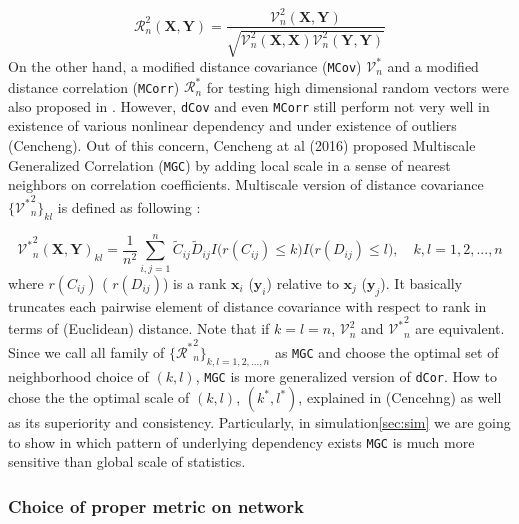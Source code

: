 \documentclass[12pt]{article}
\theoremstyle{definition}
\begin{document}
\begin{equation}	 
\mathcal{R}_{n}^{2} (\boldsymbol{X}, \boldsymbol{Y}) = \frac{\mathcal{V}^2_{n} (\boldsymbol{X}, \boldsymbol{Y}) }{\sqrt{\mathcal{V}^2_{n} (\boldsymbol{X}, \boldsymbol{X}) \mathcal{V}^2_{n} (\boldsymbol{Y}, \boldsymbol{Y}) } }
\end{equation}
On the other hand, a modified distance covariance (\texttt{MCov}) $\mathcal{V}^*_{n}$ and a modified distance correlation (\texttt{MCorr}) $\mathcal{R}^{*}_{n}$ for testing high dimensional random vectors were also proposed in \cite{szekely2013distance}.   
However, \texttt{dCov} and even \texttt{MCorr} still perform not very well in existence of various nonlinear dependency and under existence of outliers (Cencheng). Out of this concern, Cencheng at al (2016) proposed Multiscale Generalized Correlation (\texttt{MGC}) by adding local scale in a sense of nearest neighbors on correlation coefficients. Multiscale version of distance covariance $\{ { {\mathcal{V}^{*}}^2_{n} }   \}_{kl}$ is defined as following : 
	
\begin{equation}
\label{eq:MGC}
{\mathcal{V}^{*}}^2_{n} (\boldsymbol{X}, \boldsymbol{Y})_{kl} = \frac{1}{n^2} \sum\limits_{i,j=1}^{n} \tilde{C}_{ij} \tilde{D}_{ij} I \big( r(C_{ij}) \leq k \big) I \big( r(D_{ij}) \leq l  \big), \quad k,l=1,2,..., n 
\end{equation}
where $r(C_{ij})$ ( $r(D_{ij})$) is a rank $\mathbf{x}_{i}$ ($\mathbf{y}_{i}$) relative to $\mathbf{x}_{j}$ ($\mathbf{y}_{j}$). It basically truncates each pairwise element of distance covariance with respect to rank in terms of (Euclidean) distance. Note that if $k=l=n$, $\mathcal{V}^2_{n}$ and ${\mathcal{V}^{*}}^2_{n}$ are equivalent. Since we call all family of $\{  {\mathcal{R}^{*}}^2_{n} \}_{k,l = 1,2,...,n}$ as \texttt{MGC} and choose the optimal set of neighborhood choice of $(k,l)$, \texttt{MGC} is more generalized version of \texttt{dCor}. How to chose the the optimal scale of $(k,l)$, $(k^{*}, l^{*})$, explained in (Cencehng) as well as its superiority and consistency. Particularly, in simulation\ref{sec:sim} we are going to show in which pattern of underlying dependency exists \texttt{MGC} is much more sensitive than global scale of statistics. 
		
\subsubsection{Choice of proper metric on network}
\end{document}
